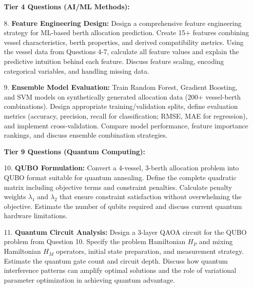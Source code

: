 \documentclass{article}
\begin{document}
\textbf{Tier 4 Questions (AI/ML Methods):}

8. \textbf{Feature Engineering Design:} Design a comprehensive feature engineering strategy for ML-based berth allocation prediction. Create 15+ features combining vessel characteristics, berth properties, and derived compatibility metrics. Using the vessel data from Questions 4-7, calculate all feature values and explain the predictive intuition behind each feature. Discuss feature scaling, encoding categorical variables, and handling missing data.

9. \textbf{Ensemble Model Evaluation:} Train Random Forest, Gradient Boosting, and SVM models on synthetically generated allocation data (200+ vessel-berth combinations). Design appropriate training/validation splits, define evaluation metrics (accuracy, precision, recall for classification; RMSE, MAE for regression), and implement cross-validation. Compare model performance, feature importance rankings, and discuss ensemble combination strategies.

\textbf{Tier 9 Questions (Quantum Computing):}

10. \textbf{QUBO Formulation:} Convert a 4-vessel, 3-berth allocation problem into QUBO format suitable for quantum annealing. Define the complete quadratic matrix including objective terms and constraint penalties. Calculate penalty weights $\lambda_1$ and $\lambda_2$ that ensure constraint satisfaction without overwhelming the objective. Estimate the number of qubits required and discuss current quantum hardware limitations.

11. \textbf{Quantum Circuit Analysis:} Design a 3-layer QAOA circuit for the QUBO problem from Question 10. Specify the problem Hamiltonian $H_P$ and mixing Hamiltonian $H_M$ operators, initial state preparation, and measurement strategy. Estimate the quantum gate count and circuit depth. Discuss how quantum interference patterns can amplify optimal solutions and the role of variational parameter optimization in achieving quantum advantage.
\end{document}
